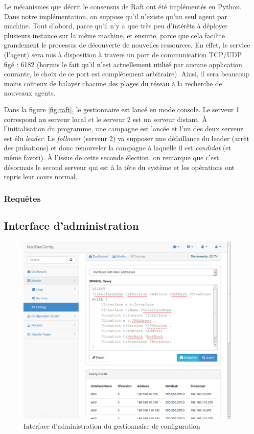 Le mécanismes que décrit le consensus de Raft ont été implémentés en Python.
Dans notre implémentation, on suppose qu'il n'existe qu'un seul agent par
machine. Tout d'abord, parce qu'il n'y a que très peu d'intérêts à déployer
plusieurs instance sur la même machine, et ensuite, parce que cela facilite
grandement le processus de découverte de nouvelles ressources. En effet, le
service (l'agent) sera mis à disposition à travers un port de communication
TCP/UDP figé : 6182 (hormis le fait qu'il n'est actuellement utilisé par aucune
application courante, le choix de ce port est complètement arbitraire). Ainsi,
il sera beaucoup moins coûteux de balayer chacune des plages du réseau à la
recherche de nouveaux agents.

Dans la figure \ref{fig:raft}, le gestionnaire est lancé en mode console. Le
serveur 1 correspond au serveur local et le serveur 2 est un serveur distant. À
l'initialisation du programme, une campagne est lancée et l'un des deux serveur
est élu \emph{leader}. Le \emph{follower} (serveur 2) va supposer une
défaillance du leader (arrêt des pulsations) et donc renouveler la campagne à
laquelle il est \emph{candidat} (et même favori). À l'issue de cette seconde
élection, on remarque que c'est désormais le second serveur qui est à la tête du
système et les opérations ont repris leur cours normal.

\subsubsection{Requêtes}

\subsection{Interface d'administration}

\begin{figure}[H]
    \centerline{\includegraphics[width=\textwidth]{img/trifle_gui}}
    \caption{Interface d'administration du gestionnaire de configuration}
    \label{fig:trifle_gui}
\end{figure}

